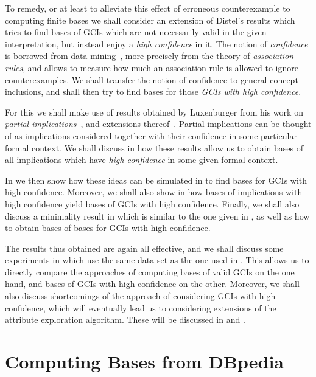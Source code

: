 To remedy, or at least to alleviate this effect of erroneous counterexample to computing
finite bases we shall consider an extension of Distel's results which tries to find bases
of GCIs which are not necessarily valid in the given interpretation, but instead enjoy a
\emph{high confidence} in it.  The notion of \emph{confidence} is borrowed from
data-mining~\cite{arules:agrawal:association-rules}, more precisely from the theory of
\emph{association rules}, and allows to measure how much an association rule is allowed to
ignore counterexamples.  We shall transfer the notion of confidence to general concept
inclusions, and shall then try to find bases for those \emph{GCIs with high confidence}.

For this we shall make use of results obtained by Luxenburger from his work on
\emph{partial implications}~\cite{diss:Luxenburger,Luxenburger91}, and extensions
thereof~\cite{DBLP:conf/ki/StummeTBPL01}.  Partial implications can be thought of as
implications considered together with their confidence in some particular formal context.
We shall discuss in  how these results allow us to obtain bases of all
implications which have \emph{high confidence} in some given formal context.

In  we then show how these ideas can be simulated in \ELgfpbot to
find bases for GCIs with high confidence.  Moreover, we shall also show in
 how bases of implications with high confidence yield bases
of GCIs with high confidence.  Finally, we shall also discuss a minimality result in
 which is similar to the one given in ,
as well as how to obtain \ELbot bases of \ELgfpbot bases for GCIs with high confidence.

The results thus obtained are again all effective, and we shall discuss some experiments
in  which use the same data-set as the one used in
.  This allows us to directly compare the approaches of
computing bases of valid GCIs on the one hand, and bases of GCIs with high confidence on
the other.  Moreover, we shall also discuss shortcomings of the approach of considering
GCIs with high confidence, which will eventually lead us to considering extensions of the
attribute exploration algorithm.  These will be discussed in  and
.

\section{Computing Bases from DBpedia}
\label{sec:computing-bases-from}

